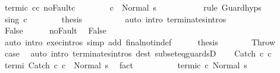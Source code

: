 \begin{isabellebody}
\ termi{\isacharunderscore}c{\isacharprime}\ c{\isacharprime}{\isacharprime}{\isacharunderscore}c{\isacharprime}\ noFault{\isacharunderscore}c{\isacharprime}\isanewline
\ \ \ \ \ \ \isamarkupfalse%
\ {\isachardoublequoteopen}{\isasymGamma}{\isasymturnstile}c{\isacharprime}{\isacharprime}\ {\isasymdown}\ Normal\ s{\isachardoublequoteclose}\ \isanewline
\ \ \ \ \ \ \ \ \isamarkupfalse%
\ {\isacharparenleft}rule\ Guard{\isachardot}hyps{\isacharparenright}\isanewline
\ \ \ \ \ \ \isamarkupfalse%
\ s{\isacharunderscore}in{\isacharunderscore}g{\isacharprime}\ c\isanewline
\ \ \ \ \ \ \isamarkupfalse%
\ {\isacharquery}thesis\isanewline
\ \ \ \ \ \ \ \ \isamarkupfalse%
\ {\isacharparenleft}auto\ intro{\isacharcolon}\ terminates{\isachardot}intros{\isacharparenright}\isanewline
\ \ \ \ \isamarkupfalse%
\isanewline
\ \ \isamarkupfalse%
\isanewline
\ \ \ \ \isamarkupfalse%
\ False\isanewline
\ \ \ \ \isamarkupfalse%
\ noFault\ \isamarkupfalse%
\ False\isanewline
\ \ \ \ \ \ \isamarkupfalse%
\ {\isacharparenleft}auto\ intro{\isacharcolon}\ exec{\isachardot}intros\ simp\ add{\isacharcolon}\ final{\isacharunderscore}notin{\isacharunderscore}def{\isacharparenright}\isanewline
\ \ \ \ \isamarkupfalse%
\ {\isacharquery}thesis\ \isacommand{{\isachardot}{\isachardot}}\isamarkupfalse%
\isanewline
\ \ \isamarkupfalse%
\isanewline
{}\isamarkupfalse%
\isanewline
\ \ \isamarkupfalse%
\ Throw\ \isamarkupfalse%
\ {\isacharquery}case\ \isamarkupfalse%
\ {\isacharparenleft}auto\ intro{\isacharcolon}\ terminates{\isachardot}intros\ dest{\isacharcolon}\ subseteq{\isacharunderscore}guardsD{\isacharparenright}\isanewline
{}\isamarkupfalse%
\isanewline
\ \ \isamarkupfalse%
\ {\isacharparenleft}Catch\ c{}{\isacharprime}\ c{}{\isacharprime}{\isacharparenright}\isanewline
\ \ \isamarkupfalse%
\ termi{\isacharcolon}\ {\isachardoublequoteopen}{\isasymGamma}{\isasymturnstile}Catch\ c{}{\isacharprime}\ c{}{\isacharprime}\ {\isasymdown}\ Normal\ s{\isachardoublequoteclose}\ \isamarkupfalse%
\ fact\isanewline
\ \ \isamarkupfalse%
\ \isamarkupfalse%
\ \isanewline
\ \ \ \ termi{\isacharunderscore}c{}{\isacharprime}{\isacharcolon}\ {\isachardoublequoteopen}{\isasymGamma}{\isasymturnstile}c{}{\isacharprime}{\isasymdown}\ Normal\ s{\isachardoublequoteclose}\ \isanewline

\end{isabellebody}
